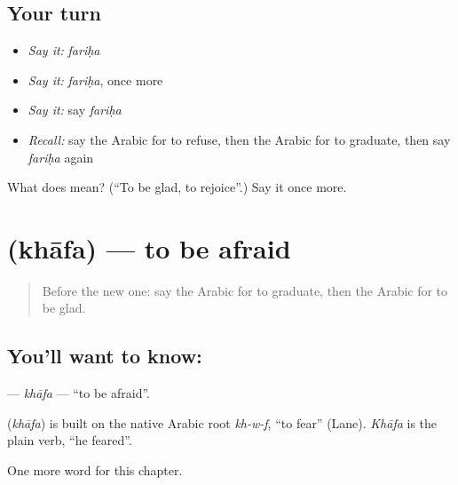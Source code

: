 \subsection*{Your turn}
\begin{itemize}
\raggedright
  \item \emph{Say it:} \emph{fariḥa}
  \item \emph{Say it:} \emph{fariḥa}, once more
  \item \emph{Say it:} say \emph{fariḥa}
  \item \emph{Recall:} say the Arabic for to refuse, then the Arabic for to graduate, then say \emph{fariḥa} again
\end{itemize}

\begin{tcolorbox}[breakable,colback=teal!4,colframe=teal!35!black,title={Before you move on}]
What does  mean? (\textquotedblleft{}To be glad, to rejoice\textquotedblright{}.) Say it once more.
\end{tcolorbox}
\section[\texorpdfstring{\ar{خاف} (khāfa)}{خاف (khāfa)}]{ (khāfa) — to be afraid}

\label{lesson:AR-C257-khafa}



\begin{quote}
Before the new one: say the Arabic for to graduate, then the Arabic for to be glad.
\end{quote}

\subsection*{You'll want to know: }
\textbf{} — \emph{khāfa} — \textquotedblleft{}to be afraid\textquotedblright{}.

\begin{cousinweb}
\textbf{} (\emph{khāfa}) is built on the native Arabic root \emph{kh-w-f}, \textquotedblleft{}to fear\textquotedblright{} (Lane). \emph{Khāfa} is the plain verb, \textquotedblleft{}he feared\textquotedblright{}.
\end{cousinweb}

\begin{grammarlens}[title={What you've built}]
One more word for this chapter.
\end{grammarlens}

